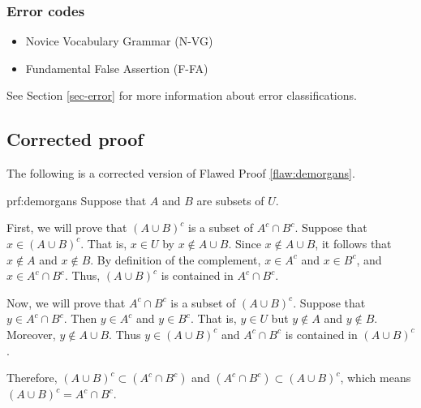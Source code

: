  
\subsubsection{Error codes}
\begin{itemize}
	\item Novice Vocabulary Grammar (N-VG)
	\item Fundamental False Assertion (F-FA)
\end{itemize}
See Section \ref{sec-error} for more information about error classifications.

\clearpage
\subsection{Corrected proof}

The following is a corrected version of Flawed Proof \ref{flaw:demorgans}. 

\begin{prf}{prf:demorgans} 
Suppose that $A$ and $B$ are subsets of $U$.  

First, we will prove that $(A\cup B)^c$ is a subset of $A^c \cap B^c$.
Suppose that $x \in (A\cup B)^c$.  That is, $x \in U$ by $x \notin A \cup B$.  Since $x \notin A \cup B$, it follows that $x \notin A$ and $x \notin B$.  By definition of the complement, $x \in A^c$ and $x \in B^c$, and $x \in A^c \cap B^c$.  Thus, $(A\cup B)^c$ is contained in $A^c \cap B^c$.

Now, we will prove that $A^c \cap B^c$ is a subset of $(A\cup B)^c$.  
Suppose that $y \in A^c \cap B^c$.  Then $y \in A^c$ and $y \in B^c$.  That is, $y \in U$ but $y \notin A$ and $y \notin B$.  Moreover, $y \notin A\cup B$.  Thus $y \in (A\cup B)^c$ and $A^c \cap B^c$ is contained in $(A \cup B)^c$.

Therefore, $(A\cup B)^c \subset (A^c \cap B^c)$ and $(A^c \cap B^c) \subset (A\cup B)^c$, which means $(A\cup B)^c = A^c \cap B^c$.
\end{prf}